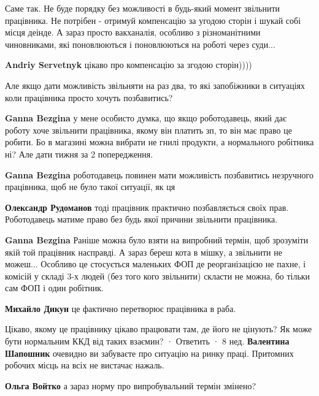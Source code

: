 \begin{itemize}

Саме так. Не буде порядку без можливості в будь-який момент звільнити
працівника. Не потрібен - отримуй компенсацію за угодою сторін і шукай собі
місця деінде. А зараз просто вакханалія, особливо з різноманітними чиновниками,
які поновлюються і поновлюються на роботі через суди...

\begin{itemize} %
\textbf{Andriy Servetnyk} цікаво про компенсацію за згодою сторін))))
\end{itemize} %

Але якщо дати можливість звільняти на раз два, то які запобіжники в ситуаціях
коли працівника просто хочуть позбавитись?

\begin{itemize} %
\textbf{Ganna Bezgina} у мене особисто думка, що якщо роботодавець, який дає роботу хоче звільнити працівника, якому він платить зп, то він має право це робити.
Бо в магазині можна вибрати не гнилі продукти, а нормального робітника ні? Але дати тижня за 2 попередження.

\textbf{Ganna Bezgina} роботодавець повинен мати можливість позбавитись незручного працівника, щоб не було такої ситуації, як ця

\textbf{Олександр Рудоманов} тоді працівник практично позбавляється своїх прав. Роботодавець матиме право без будь якої причини звільнити працівника.

\textbf{Ganna Bezgina} Раніше можна було взяти на випробний термін, щоб зрозуміти якій той працівник насправді. А зараз береш кота в мішку, а звільнити не можеш... Особливо це стосується маленьких ФОП де реорганізацією не пахне, і комісій у складі 3-х людей (без того кого звільнити) скласти не можна, бо тільки сам ФОП і один робітник.

\textbf{Михайло Дикун} це фактично перетворює працівника в раба.

Цікаво, якому це працівнику цікаво працювати там, де його не цінують? Як може бути нормальним ККД від таких взаємин?
 · Ответить · 8 нед.
\textbf{Валентина Шапошник} очевидно ви забуваєте про ситуацію на ринку праці. Притомних робочих місць на всіх не вистачає нажаль.

\textbf{Ольга Войтко} а зараз норму про випробувальний термін змінено?


\end{itemize}
\end{itemize}
